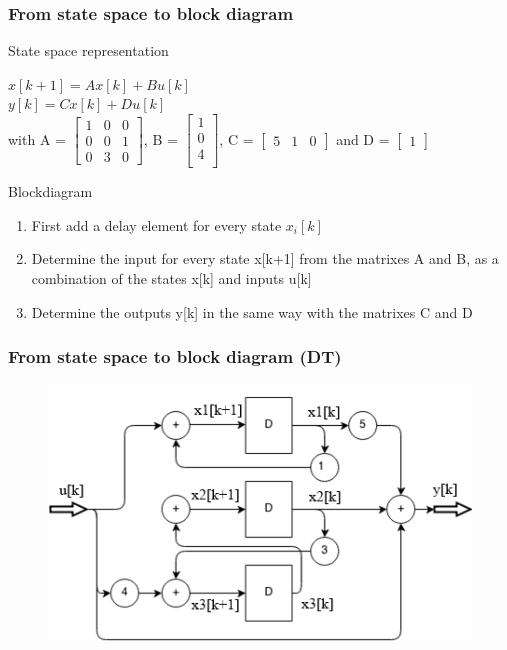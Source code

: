 \begin{frame}
	\frametitle{From state space to block diagram }
		\begin{block}{State space representation}
				\begin{center}
					$x[k+1] = A x[k] + B u[k]$ \\
					$y[k] = C x[k] + D u[k] $ \\
					
					with  A = 
					$\begin{bmatrix}
					1 & 0 & 0 \\
					0 & 0 & 1 \\
					0 & 3 & 0
					\end{bmatrix}$,
					B = 
					$\begin{bmatrix}
					1\\
					0\\
					4\\
					\end{bmatrix}$,
					C = 
					$\begin{bmatrix}
					5 & 1 & 0
					\end{bmatrix}$ 
					and D = 
					$\begin{bmatrix}
					1
					\end{bmatrix}$ \\
				\end{center}
		\end{block}
	\begin{block}{Blockdiagram}
		\begin{enumerate}
			\item First add a delay element for every state $x_i[k]$
			\item 	Determine the input for every state x[k+1] from the matrixes A and B, as a combination of the states x[k] and inputs u[k]
			\item Determine the outputs y[k] in the same way with the matrixes C and D
		\end{enumerate}
	
	\end{block}
	


\end{frame}
\begin{frame}
	\frametitle{From state space to block diagram (DT)}
	\begin{figure}
		\centering
		\includegraphics[width=0.7\linewidth]{Images/discrete_time_systems_18}
		\caption{}
		\label{fig:discrete_time_systems_18}
	\end{figure}

	
\end{frame}
